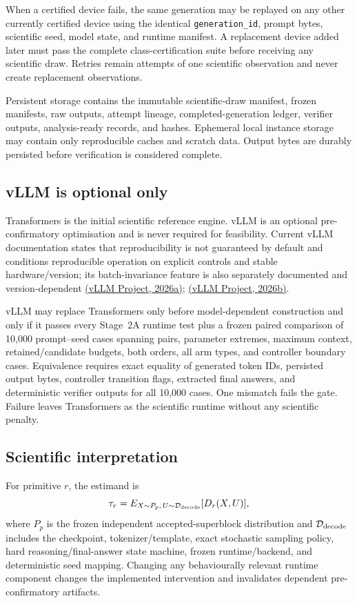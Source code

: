 \documentclass[11pt,a4paper]{article}
\begin{document}
When a certified device fails, the same generation may be replayed on any other currently certified device using the identical \texttt{generation\_id}, prompt bytes, scientific seed, model state, and runtime manifest. A replacement device added later must pass the complete class-certification suite before receiving any scientific draw. Retries remain attempts of one scientific observation and never create replacement observations.

Persistent storage contains the immutable scientific-draw manifest, frozen manifests, raw outputs, attempt lineage, completed-generation ledger, verifier outputs, analysis-ready records, and hashes. Ephemeral local instance storage may contain only reproducible caches and scratch data. Output bytes are durably persisted before verification is considered complete.

\subsection{vLLM is optional only}
Transformers is the initial scientific reference engine. vLLM is an optional pre-confirmatory optimisation and is never required for feasibility. Current vLLM documentation states that reproducibility is not guaranteed by default and conditions reproducible operation on explicit controls and stable hardware/version; its batch-invariance feature is also separately documented and version-dependent \href{https://docs.vllm.ai/en/latest/usage/reproducibility.html}{(vLLM Project, 2026a)}; \href{https://docs.vllm.ai/en/stable/features/batch_invariance/}{(vLLM Project, 2026b)}.

vLLM may replace Transformers only before model-dependent construction and only if it passes every Stage~2A runtime test plus a frozen paired comparison of 10,000 prompt--seed cases spanning pairs, parameter extremes, maximum context, retained/candidate budgets, both orders, all arm types, and controller boundary cases. Equivalence requires exact equality of generated token IDs, persisted output bytes, controller transition flags, extracted final answers, and deterministic verifier outputs for all 10,000 cases. One mismatch fails the gate. Failure leaves Transformers as the scientific runtime without any scientific penalty.

\subsection{Scientific interpretation}
For primitive $r$, the estimand is
\[
\tau_r=E_{X\sim P_p,\,U\sim\mathcal D_{\rm decode}}[D_r(X,U)],
\]
where $P_p$ is the frozen independent accepted-superblock distribution and $\mathcal D_{\rm decode}$ includes the checkpoint, tokenizer/template, exact stochastic sampling policy, hard reasoning/final-answer state machine, frozen runtime/backend, and deterministic seed mapping. Changing any behaviourally relevant runtime component changes the implemented intervention and invalidates dependent pre-confirmatory artifacts.
\end{document}
